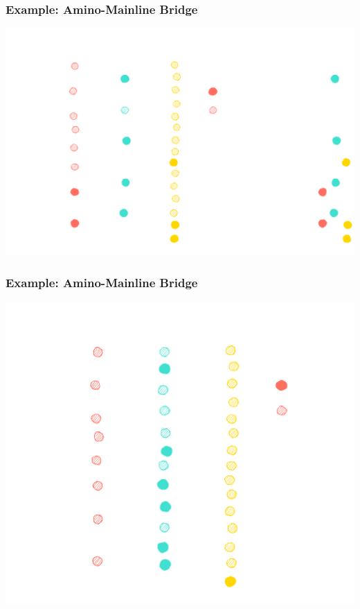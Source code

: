 \documentclass{../shipyard-slide}
\begin{document}
\begin{frame}
\frametitle{Example: Amino-Mainline Bridge}

\hspace{2cm}\includegraphics[scale=.13]{resources/rt2-1.png}


\end{frame}

\begin{frame}
\frametitle{Example: Amino-Mainline Bridge}

\hspace{2cm}\includegraphics[scale=.13]{resources/rt3-0.png}


\end{frame}
\end{document}
